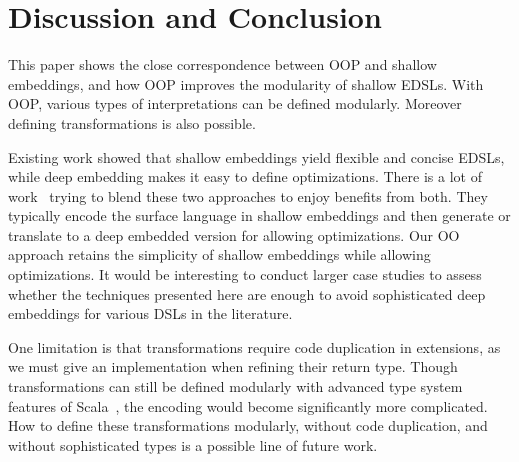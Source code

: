 \section{Discussion and Conclusion}
This paper shows the close correspondence between OOP and shallow
embeddings, and how OOP improves the modularity of shallow EDSLs.
With OOP, various types of interpretations can be defined modularly. 
Moreover defining transformations is also possible.

Existing work showed that shallow embeddings yield flexible and
concise EDSLs, while deep embedding makes it easy to define
optimizations. There is a lot of work~\cite{svenningsson2012combining,
  Jovanovic:2014:YCD:2658761.2658771, scherr2014implicit} trying to blend these two
approaches to enjoy benefits from both.
They typically encode the surface language in shallow embeddings and
then generate or translate to a deep embedded version for allowing optimizations.
Our OO approach retains the simplicity of shallow embeddings while
allowing optimizations. It would be interesting
to conduct larger case studies to assess whether the techniques
presented here are enough to avoid sophisticated deep embeddings for various DSLs
in the literature.

One limitation is that
transformations require code duplication in extensions,
as we must give an implementation when refining their return type.
Though transformations can still be defined modularly with advanced type
system features of Scala~\cite{zenger05independentlyextensible},
the encoding would become significantly more complicated.
How to define these transformations modularly, without code
duplication, and without sophisticated types
is a possible line of future work.  
